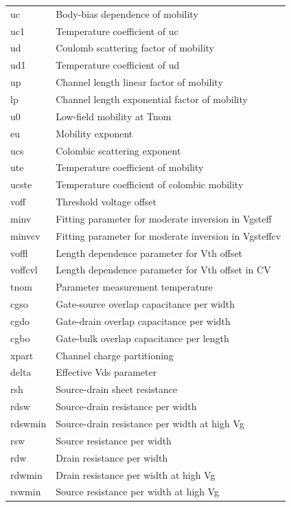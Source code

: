 \begin{longtable}{l l}
{\small uc} & {\small Body-bias dependence of mobility} \\
{\small uc1} & {\small Temperature coefficient of uc} \\
{\small ud} & {\small Coulomb scattering factor of mobility} \\
{\small ud1} & {\small Temperature coefficient of ud} \\
{\small up} & {\small Channel length linear factor of mobility} \\
{\small lp} & {\small Channel length exponential factor of mobility} \\
{\small u0} & {\small Low-field mobility at Tnom} \\
{\small eu} & {\small Mobility exponent} \\
{\small ucs} & {\small Colombic scattering exponent} \\
{\small ute} & {\small Temperature coefficient of mobility} \\
{\small ucste} & {\small Temperature coefficient of colombic mobility} \\
{\small voff} & {\small Threshold voltage offset} \\
{\small minv} & {\small Fitting parameter for moderate inversion in Vgsteff} \\
{\small minvcv} & {\small Fitting parameter for moderate inversion in Vgsteffcv} \\
{\small voffl} & {\small Length dependence parameter for Vth offset} \\
{\small voffcvl} & {\small Length dependence parameter for Vth offset in CV} \\
{\small tnom} & {\small Parameter measurement temperature} \\
{\small cgso} & {\small Gate-source overlap capacitance per width} \\
{\small cgdo} & {\small Gate-drain overlap capacitance per width} \\
{\small cgbo} & {\small Gate-bulk overlap capacitance per length} \\
{\small xpart} & {\small Channel charge partitioning} \\
{\small delta} & {\small Effective Vds parameter} \\
{\small rsh} & {\small Source-drain sheet resistance} \\
{\small rdsw} & {\small Source-drain resistance per width} \\    
{\small rdswmin} & {\small Source-drain resistance per width at high Vg} \\
{\small rsw} & {\small Source resistance per width} \\
{\small rdw} & {\small Drain resistance per width} \\
{\small rdwmin} & {\small Drain resistance per width at high Vg} \\
{\small rswmin} & {\small Source resistance per width at high Vg} \\


\end{longtable}
